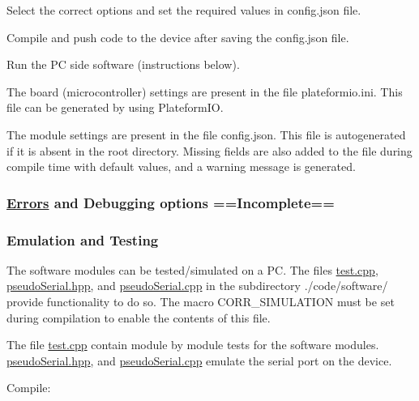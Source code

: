 \begin{DoxyEnumerate}
\item Select the correct options and set the required values in {\ttfamily config.\+json} file.
\item Compile and push code to the device after saving the {\ttfamily config.\+json} file.
\item Run the PC side software (instructions below). 


\end{DoxyEnumerate}
\begin{DoxyItemize}
\item The board (microcontroller) settings are present in the file {\ttfamily plateformio.\+ini}. This file can be generated by using {\ttfamily Plateform\+IO}.
\item The module settings are present in the file {\ttfamily config.\+json}. This file is autogenerated if it is absent in the root directory. Missing fields are also added to the file during compile time with default values, and a warning message is generated.
\end{DoxyItemize}

\subsubsection*{\hyperlink{classErrors}{Errors} and Debugging options ==Incomplete==}

\subsubsection*{Emulation and Testing}


\begin{DoxyItemize}
\item The software modules can be tested/simulated on a PC. The files {\ttfamily \hyperlink{test_8cpp}{test.\+cpp}}, {\ttfamily \hyperlink{pseudoSerial_8hpp}{pseudo\+Serial.\+hpp}}, and {\ttfamily \hyperlink{pseudoSerial_8cpp}{pseudo\+Serial.\+cpp}} in the subdirectory {\ttfamily ./code/software/} provide functionality to do so. The macro {\ttfamily C\+O\+R\+R\+\_\+\+S\+I\+M\+U\+L\+A\+T\+I\+ON} must be set during compilation to enable the contents of this file.
\item The file {\ttfamily \hyperlink{test_8cpp}{test.\+cpp}} contain module by module tests for the software modules. {\ttfamily \hyperlink{pseudoSerial_8hpp}{pseudo\+Serial.\+hpp}}, and {\ttfamily \hyperlink{pseudoSerial_8cpp}{pseudo\+Serial.\+cpp}} emulate the serial port on the device.

Compile\+:
\end{DoxyItemize}


